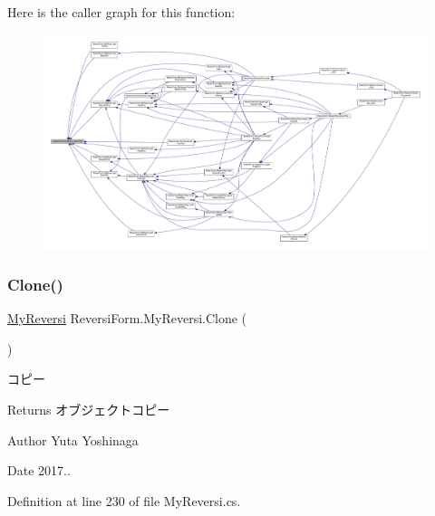 Here is the caller graph for this function\+:\nopagebreak
\begin{figure}[H]
\begin{center}
\leavevmode
\includegraphics[width=350pt]{class_reversi_form_1_1_my_reversi_a7d861112d0ddeb404cd3e8d8f5c2756b_icgraph}
\end{center}
\end{figure}
\mbox{\label{class_reversi_form_1_1_my_reversi_aa340f79c0f7bb78750c410ce73ca7b99}} 
\subsubsection{\texorpdfstring{Clone()}{Clone()}}
{\footnotesize\ttfamily \hyperlink{class_reversi_form_1_1_my_reversi}{My\+Reversi} Reversi\+Form.\+My\+Reversi.\+Clone (\begin{DoxyParamCaption}{ }\end{DoxyParamCaption})}



コピー 

\begin{DoxyReturn}{Returns}
オブジェクトコピー 
\end{DoxyReturn}
\begin{DoxyAuthor}{Author}
Yuta Yoshinaga 
\end{DoxyAuthor}
\begin{DoxyDate}{Date}
2017.. 
\end{DoxyDate}


Definition at line 230 of file My\+Reversi.\+cs.

\mbox{\label{class_reversi_form_1_1_my_reversi_aa69640136727deb89addafae8e8e54cb}} 
